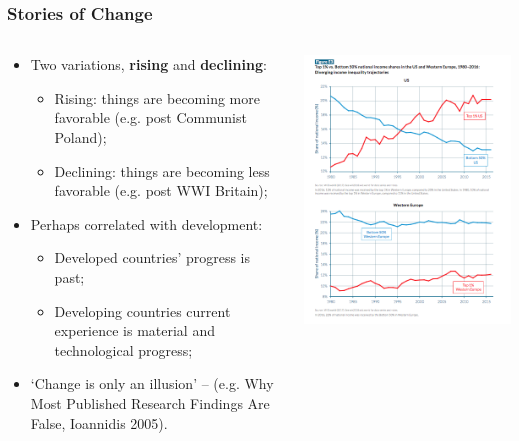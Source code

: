 \documentclass[aspectratio=169]{beamer}
\theoremstyle{principle}
\begin{document}
\begin{frame}
\frametitle{Stories of Change}
\begin{columns}
\begin{column}{0.5\textwidth}

\begin{itemize}
\item Two variations, \textbf{rising} and \textbf{declining}:
\begin{itemize}
\item Rising: things are becoming more favorable (e.g. post Communist Poland);
\item Declining: things are becoming less favorable (e.g. post WWI Britain);
\end{itemize}
\bigskip
\item Perhaps correlated with development:
\begin{itemize}
\item Developed countries' progress is past;
\item Developing countries current experience is material and technological progress;
\end{itemize}
\bigskip
\item `Change is only an illusion' -- (e.g. Why Most Published Research Findings Are False, Ioannidis 2005).
\end{itemize}

\end{column}
\begin{column}{0.5\textwidth}
\includegraphics[scale=0.3]{inequality_US.png}
\end{column}
\end{columns}

\end{frame}
\end{document}
